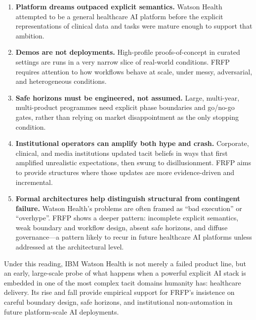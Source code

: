 \begin{enumerate}
  \item \textbf{Platform dreams outpaced explicit semantics.}
        Watson Health attempted to be a general healthcare AI platform
        before the explicit representations of clinical data and tasks were
        mature enough to support that ambition.

  \item \textbf{Demos are not deployments.}
        High-profile proofs-of-concept in curated settings are runs in a
        very narrow slice of real-world conditions.
        FRFP requires attention to how workflows behave at scale, under
        messy, adversarial, and heterogeneous conditions.

  \item \textbf{Safe horizons must be engineered, not assumed.}
        Large, multi-year, multi-product programmes need explicit phase
        boundaries and go/no-go gates, rather than relying on market
        disappointment as the only stopping condition.

  \item \textbf{Institutional operators can amplify both hype and crash.}
        Corporate, clinical, and media institutions updated tacit beliefs
        in ways that first amplified unrealistic expectations, then swung
        to disillusionment.
        FRFP aims to provide structures where those updates are more
        evidence-driven and incremental.

  \item \textbf{Formal architectures help distinguish structural from
        contingent failure.}
        Watson Health’s problems are often framed as ``bad execution'' or
        ``overhype''.
        FRFP shows a deeper pattern:
        incomplete explicit semantics, weak boundary and workflow design,
        absent safe horizons, and diffuse governance---a pattern likely to
        recur in future healthcare AI platforms unless addressed at the
        architectural level.
\end{enumerate}

Under this reading, IBM Watson Health is not merely a failed product line,
but an early, large-scale probe of what happens when a powerful explicit
AI stack is embedded in one of the most complex tacit domains humanity has:
healthcare delivery.
Its rise and fall provide empirical support for FRFP’s insistence on
careful boundary design, safe horizons, and institutional non-automation
in future platform-scale AI deployments.

